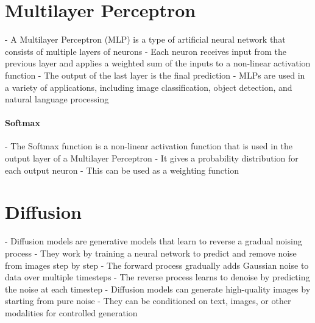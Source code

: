 \section{Multilayer Perceptron}
- A Multilayer Perceptron (MLP) is a type of artificial neural network that consists of multiple layers of neurons
- Each neuron receives input from the previous layer and applies a weighted sum of the inputs to a non-linear activation function
- The output of the last layer is the final prediction
- MLPs are used in a variety of applications, including image classification, object detection, and natural language processing

\paragraph{Softmax}
- The Softmax function is a non-linear activation function that is used in the output layer of a Multilayer Perceptron
- It gives a probability distribution for each output neuron
- This can be used as a weighting function

\section{Diffusion}
- Diffusion models are generative models that learn to reverse a gradual noising process
- They work by training a neural network to predict and remove noise from images step by step
- The forward process gradually adds Gaussian noise to data over multiple timesteps
- The reverse process learns to denoise by predicting the noise at each timestep
- Diffusion models can generate high-quality images by starting from pure noise
- They can be conditioned on text, images, or other modalities for controlled generation
